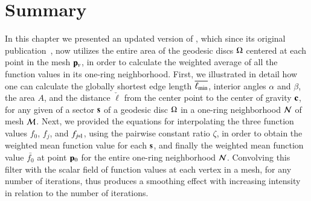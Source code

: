 \section{Summary}
\label{ch4sS}
In this chapter we presented an updated version of , which since its original publication~\cite[s.~3.2]{Mara17}, now utilizes the entire area of the geodesic discs $\Omega$ centered at each point in the mesh $\mathbf{p}_v$, in order to calculate the weighted average of all the function values in its one-ring neighborhood. First, we illustrated in detail how one can calculate the globally shortest edge length $\overline{\ell_\text{min}}$, interior angles $\alpha$ and $\beta$, the area $A$, and the distance $\check{\ell}$ from the center point to the center of gravity $\mathbf{c}$, for any given of a sector $\mathbf{s}$ of a geodesic disc $\Omega$ in a one-ring neighborhood $\mathcal{N}$ of mesh $\mathcal{M}$. Next, we provided the equations for interpolating the three function values $f_0$, $f_j$, and $f_{\sjpo}$, using the pairwise constant ratio $\zeta$, in order to obtain the weighted mean function value for each $\mathbf{s}$, and finally the weighted mean function value $\bar{f_0}$ at point ${\mathbf{p}_0}$ for the entire one-ring neighborhood $\mathcal{N}$. Convolving this filter with the scalar field of function values at each vertex in a mesh, for any number of iterations, thus produces a smoothing effect with increasing intensity in relation to the number of iterations.
